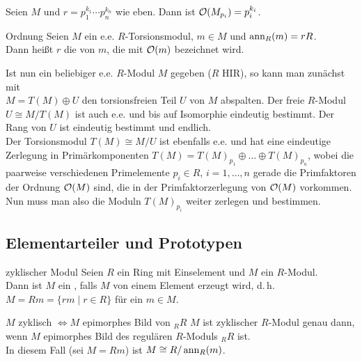 \begin{Kor}
    Seien $M$ und $r = p_1^{k_1} \dotsm p_n^{k_n}$ wie eben.
    Dann ist $\mathcal{O}(M_{p_i}) = p_i^{k_i}$.
\end{Kor}

\begin{Def}{Ordnung}
    Seien $M$ ein e.e. $R$-Torsionsmodul, $m \in M$ und $\operatorname{ann}_R(m) = rR$. \\
    Dann heißt $r$ die  von $m$, die mit $\mathcal{O}(m)$
    bezeichnet wird.
\end{Def}

\begin{Bem}
    Ist nun ein beliebiger e.e. $R$-Modul $M$ gegeben ($R$ HIR), so kann
    man zunächst mit \\
    $M = T(M) \oplus U$ den torsionsfreien Teil $U$ von $M$ abspalten.
    Der freie $R$-Modul $U \cong M/T(M)$ ist auch e.e. und bis auf Isomorphie
    eindeutig bestimmt.
    Der Rang von $U$ ist eindeutig bestimmt und endlich. \\
    Der Torsionsmodul $T(M) \cong M/U$ ist ebenfalls e.e. und hat eine
    eindeutige Zerlegung in Primärkomponenten
    $T(M) = T(M)_{p_1} \oplus \dotsc \oplus T(M)_{p_n}$, wobei die paarweise
    verschiedenen Primelemente $p_i \in R$, $i = 1, \dotsc, n$ gerade die
    Primfaktoren der Ordnung $\mathcal{O}(M)$ sind, die in der
    Primfaktorzerlegung von $\mathcal{O}(M)$ vorkommen.
    Nun muss man also die Moduln $T(M)_{p_i}$ weiter zerlegen und bestimmen.
\end{Bem}

\pagebreak

\subsection{%
    Elementarteiler und Prototypen%
}

\begin{Def}{zyklischer Modul}
    Seien $R$ ein Ring mit Einselement und $M$ ein $R$-Modul. \\
    Dann ist $M$ ein , falls $M$ von einem
    Element erzeugt wird, d.\,h. \\
    $M = Rm = \{rm \;|\; r \in R\}$ für ein $m \in M$.
\end{Def}

\begin{Satz}{$M$ zyklisch $\Leftrightarrow M$ epimorphes Bild von ${}_R R$}
    $M$ ist zyklischer $R$-Modul genau dann, wenn $M$ epimorphes Bild des
    regulären $R$-Moduls ${}_R R$ ist. \\
    In diesem Fall (sei $M = Rm$) ist $M \cong R/\operatorname{ann}_R(m)$.
\end{Satz}

